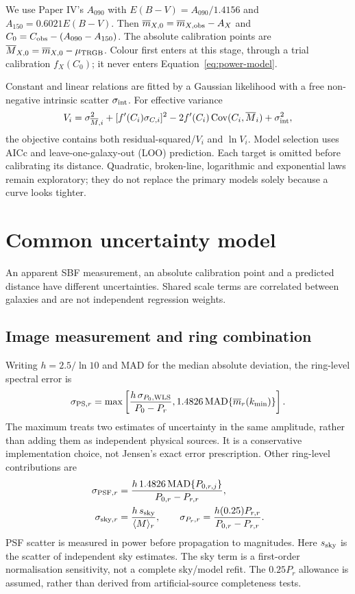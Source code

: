 \documentclass[nodoi,nocopyright]{pas}
\newcommand{\mbar}{\overline{m}}
\newcommand{\Mbar}{\overline{M}}
\begin{document}
We use Paper IV's $A_{090}$ with $E(B-V)=A_{090}/1.4156$ and
$A_{150}=0.6021E(B-V)$. Then
$\mbar_{X,0}=\mbar_{X,\rm obs}-A_X$ and
$C_0=C_{\rm obs}-(A_{090}-A_{150})$.
The absolute calibration points are
$\Mbar_{X,0}=\mbar_{X,0}-\mu_{\rm TRGB}$.
Colour first enters at this stage, through a trial calibration $f_X(C_0)$;
it never enters Equation~\ref{eq:power-model}.

Constant and linear relations are fitted by a Gaussian likelihood with a
free non-negative intrinsic scatter $\sigma_{\rm int}$. For effective
variance
\begin{equation}
 V_i=\sigma^2_{\Mbar,i}+[f'(C_i)\sigma_{C,i}]^2
 -2f'(C_i)\operatorname{Cov}(C_i,\Mbar_i)+\sigma_{\rm int}^2,
 \label{eq:variance-fit}
\end{equation}
the objective contains both residual-squared/$V_i$ and $\ln V_i$.
Model selection uses AICc and leave-one-galaxy-out (LOO) prediction.
Each target is omitted before calibrating its distance.
Quadratic, broken-line, logarithmic and exponential laws remain exploratory;
they do not replace the primary models solely because a curve looks tighter.

\section{Common uncertainty model}
\label{sec:errors}

An apparent SBF measurement, an absolute calibration point and a predicted
distance have different uncertainties. Shared scale terms are correlated
between galaxies and are not independent regression weights.

\subsection{Image measurement and ring combination}

Writing $h=2.5/\ln10$ and MAD for the median absolute deviation, the
ring-level spectral error is
\begin{equation}
 \sigma_{{\rm PS},r}=\max\left[
 \frac{h\,\sigma_{P_0,\rm WLS}}{P_0-P_r},
 1.4826\,{\rm MAD}\{\mbar_r(k_{\min})\}\right].
 \label{eq:spectrum-error}
\end{equation}
The maximum treats two estimates of uncertainty in the same amplitude,
rather than adding them as independent physical sources. It is a
conservative implementation choice, not Jensen's exact error prescription.
Other ring-level contributions are
\begin{align}
 \sigma_{{\rm PSF},r}&=\frac{h\,1.4826\,{\rm MAD}\{P_{0,r,j}\}}{P_{0,r}-P_{r,r}},
 \\
 \sigma_{{\rm sky},r}&=\frac{h\,s_{\rm sky}}{\langle M\rangle_r},
 \qquad
 \sigma_{P_r,r}=\frac{h(0.25)P_{r,r}}{P_{0,r}-P_{r,r}}.
\end{align}
PSF scatter is measured in power before propagation to magnitudes.
Here $s_{\rm sky}$ is the scatter of independent sky estimates.
The sky term is a first-order normalisation sensitivity, not a complete
sky/model refit. The $0.25P_r$ allowance is assumed, rather than derived
from artificial-source completeness tests.
\end{document}
